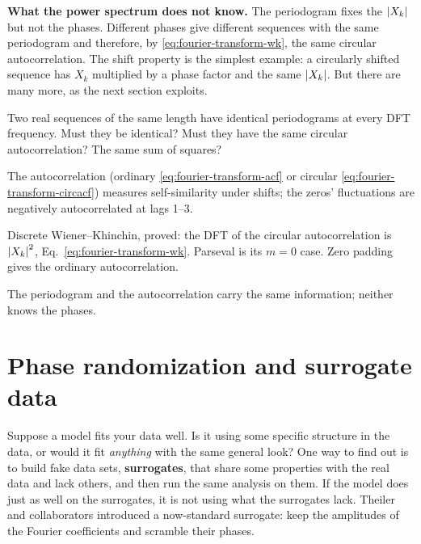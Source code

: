 \textbf{What the power spectrum does not know.} The periodogram fixes the $\left\lvert X_k\right\rvert$ but not the phases. Different phases give different sequences with the same periodogram and therefore, by \eqref{eq:fourier-transform-wk}, the same circular autocorrelation. The shift property is the simplest example: a circularly shifted sequence has $X_k$ multiplied by a phase factor and the same $\left\lvert X_k\right\rvert$. But there are many more, as the next section exploits.

\begin{checkpoint}
Two real sequences of the same length have identical periodograms at every DFT frequency. Must they be identical? Must they have the same circular autocorrelation? The same sum of squares?
\end{checkpoint}

\begin{keyideas}

\item The autocorrelation (ordinary \eqref{eq:fourier-transform-acf} or circular \eqref{eq:fourier-transform-circacf}) measures self-similarity under shifts; the zeros' fluctuations are negatively autocorrelated at lags 1--3.
\item Discrete Wiener--Khinchin, proved: the DFT of the circular autocorrelation is $\left\lvert X_k\right\rvert^2$, Eq.~\eqref{eq:fourier-transform-wk}. Parseval is its $m=0$ case. Zero padding gives the ordinary autocorrelation.
\item The periodogram and the autocorrelation carry the same information; neither knows the phases.

\end{keyideas}

\section{Phase randomization and surrogate data}\label{sec:fourier-transform-surrogates}

Suppose a model fits your data well. Is it using some specific structure in the data, or would it fit \emph{anything} with the same general look? One way to find out is to build fake data sets, \textbf{surrogates}, that share some properties with the real data and lack others, and then run the same analysis on them. If the model does just as well on the surrogates, it is not using what the surrogates lack. Theiler and collaborators \cite{theiler} introduced a now-standard surrogate: keep the amplitudes of the Fourier coefficients and scramble their phases.

